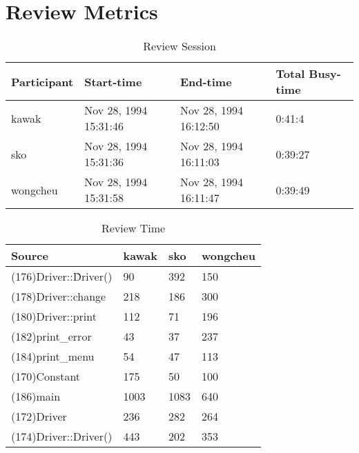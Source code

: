 \section{Review Metrics}
\begin{table}[hb]
\begin{center}
\begin{tabular}{|l|l|l|l|}
\hline
Participant & Start-time & End-time & Total Busy-time \\
\hline
kawak & Nov 28, 1994 15:31:46 & Nov 28, 1994 16:12:50 & 0:41:4 \\
sko & Nov 28, 1994 15:31:36 & Nov 28, 1994 16:11:03 & 0:39:27 \\
wongcheu & Nov 28, 1994 15:31:58 & Nov 28, 1994 16:11:47 & 0:39:49 \\
\hline
\end{tabular}
\end{center}
\caption{Review Session}
\end{table}


\begin{table}[hb]
\begin{center}
\begin{tabular}{|l|l|l|l|}
\hline
Source & kawak & sko & wongcheu\\
\hline
(176)Driver::\~Driver() & 90 & 392 & 150\\
(178)Driver::change & 218 & 186 & 300\\
(180)Driver::print & 112 & 71 & 196\\
(182)print\_error & 43 & 37 & 237\\
(184)print\_menu & 54 & 47 & 113\\
(170)Constant & 175 & 50 & 100\\
(186)main & 1003 & 1083 & 640\\
(172)Driver & 236 & 282 & 264\\
(174)Driver::Driver() & 443 & 202 & 353\\
\hline
\end{tabular}
\end{center}
\caption{Review Time}
\end{table}


